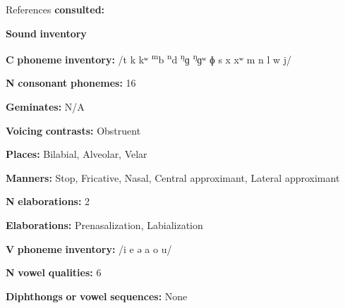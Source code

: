 \begin{styleBody}
References \textbf{consulted:} \citet{Loughnane2009}
\end{styleBody}

\begin{styleBody}
\textbf{Sound} \textbf{inventory}
\end{styleBody}

\begin{styleBody}
\textbf{C} \textbf{phoneme} \textbf{inventory:} /t k kʷ \textsuperscript{m}b \textsuperscript{n}d \textsuperscript{ŋ}ɡ \textsuperscript{ŋ}ɡʷ ɸ s x xʷ m n l w j/
\end{styleBody}

\begin{styleBody}
\textbf{N} \textbf{consonant} \textbf{phonemes:} 16
\end{styleBody}

\begin{styleBody}
\textbf{Geminates:} N/A
\end{styleBody}

\begin{styleBody}
\textbf{Voicing} \textbf{contrasts:} Obstruent
\end{styleBody}

\begin{styleBody}
\textbf{Places:} Bilabial, Alveolar, Velar
\end{styleBody}

\begin{styleBody}
\textbf{Manners:} Stop, Fricative, Nasal, Central approximant, Lateral approximant
\end{styleBody}

\begin{styleBody}
\textbf{N} \textbf{elaborations:} 2
\end{styleBody}

\begin{styleBody}
\textbf{Elaborations:} Prenasalization, Labialization
\end{styleBody}

\begin{styleBody}
\textbf{V} \textbf{phoneme} \textbf{inventory:} /i e ə a o u/
\end{styleBody}

\begin{styleBody}
\textbf{N} \textbf{vowel} \textbf{qualities:} 6
\end{styleBody}

\begin{styleBody}
\textbf{Diphthongs} \textbf{or} \textbf{vowel} \textbf{sequences:} None
\end{styleBody}

